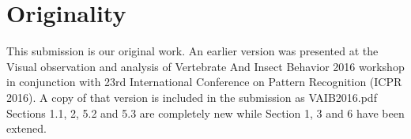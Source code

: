 \documentclass[10pt,a4paper]{article}
\begin{document}
\section{Originality}
This submission is our original work. An earlier version was presented at the Visual observation and analysis of Vertebrate And Insect Behavior 2016 workshop  in conjunction with 23rd International Conference on Pattern Recognition (ICPR 2016). A copy of that version is included in the submission as VAIB2016.pdf Sections 1.1, 2, 5.2 and 5.3 are completely new while Section 1, 3 and 6 have been extened.


{\parindent0pt
\parskip8pt

}
\end{document}
